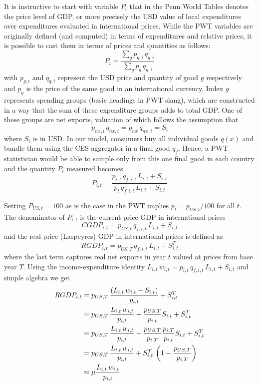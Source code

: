 \documentclass[12pt]{article}
\begin{document}
It is instructive to start with variable $P_{i}$ that in the Penn World
Tables denotes the price level of GDP, or more precisely the USD value of
local expenditures over expenditures evaluated in international prices.
While the PWT variables are originally defined (and computed) in terms of
expenditures and relative prices, it is possible to cast them in terms of
prices and quantities as follows: 
\begin{equation*}
P_{i}=\frac{\sum_{g}p_{g,i}\,q_{g,i}}{\sum_{g}p_{g}\,q_{g,i}}
\end{equation*}
with $p_{g,i}$ and $q_{q,i}$ represent the USD price and quantity of good $g 
$ respectively and $p_{g}$ is the price of the same good in an international
currency. Index $g$ represents spending groups (basic headings in PWT
slang), which are constructed in a way that the sum of these expenditure
groups adds to total GDP. One of these groups are net exports, valuation of
which follows the assumption that 
\begin{equation*}
p_{nx,i}\,q_{nx,i}=p_{nx}\,q_{nx,i}=S_{i}
\end{equation*}
where $S_{i}$ is in USD. In our model, consumers buy all individual goods $%
q(x)$ and bundle them using the CES aggregator in a final good $q_{f}$.
Hence, a PWT statistician would be able to sample only from this one final
good in each country and the quantity $P_{i}$ measured becomes 
\begin{equation*}
P_{i,t}=\frac{p_{i,t}\,q_{f,i,t}\,L_{i,t}+S_{i,t}}{p_{t}\,q_{f,i,t}%
\,L_{i,t}+S_{i,t}}
\end{equation*}

Setting $P_{US,t}=100$ as is the case in the PWT implies $p_{t}=p_{US,t}/100$
for all $t$. The denominator of $P_{i,t}$ is the current-price GDP in
international prices 
\begin{equation*}
CGDP_{i,t}=p_{US,t}\,q_{f,i,t}\,L_{i,t}+S_{i,t}
\end{equation*}
and the real-price (Laspeyres) GDP in international prices is defined as 
\begin{equation*}
RGDP_{i,t}=p_{US,T}\,q_{f,i,t}\,L_{i,t}+S_{i,t}^{T}
\end{equation*}
where the last term captures real net exports in year $t$ valued at prices
from base year $T$. Using the income-expenditure identity $%
L_{i,t}\,w_{i,t}=p_{i,t}\,q_{f,i,t}\,L_{i,t}+S_{i,t}$ and simple algebra we
get 
\begin{align*}
RGDP_{i,t}& =p_{US,T}\,\frac{\left( L_{i,t}\,w_{i,t}-S_{i,t}\right) }{p_{i,t}%
}+S_{i,t}^{T} \\
& =p_{US,T}\,\frac{L_{i,t}\,w_{i,t}}{p_{i,t}}-\frac{p_{US,T}}{p_{i,t}}%
S_{i,t}+S_{i,t}^{T} \\
& =p_{US,T}\,\frac{L_{i,t}\,w_{i,t}}{p_{i,t}}-\frac{p_{US,T}}{p_{i,T}}\frac{%
p_{i,T}}{p_{i,t}}S_{i,t}+S_{i,t}^{T} \\
& =p_{US,T}\,\frac{L_{i,t}\,w_{i,t}}{p_{i,t}}+S_{i,t}^{T}\,\left( 1-\frac{%
p_{US,T}}{p_{i,T}}\right) \\
& \approx \mu \frac{L_{i,t}\,w_{i,t}}{p_{i,t}}
\end{align*}
\end{document}
